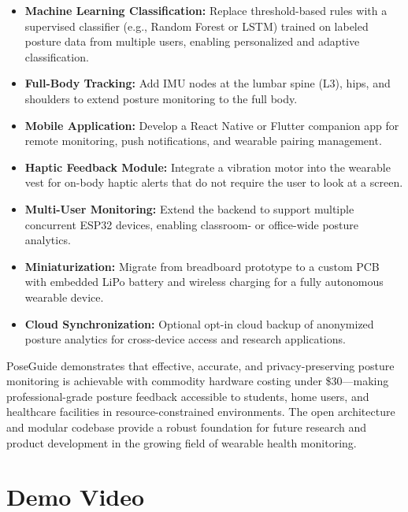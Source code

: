 \documentclass[12pt,a4paper]{report}
\begin{document}
\begin{itemize}[leftmargin=2em]
    \item \textbf{Machine Learning Classification:} Replace threshold-based rules with a supervised classifier (e.g., Random Forest or LSTM) trained on labeled posture data from multiple users, enabling personalized and adaptive classification.
    \item \textbf{Full-Body Tracking:} Add IMU nodes at the lumbar spine (L3), hips, and shoulders to extend posture monitoring to the full body.
    \item \textbf{Mobile Application:} Develop a React Native or Flutter companion app for remote monitoring, push notifications, and wearable pairing management.
    \item \textbf{Haptic Feedback Module:} Integrate a vibration motor into the wearable vest for on-body haptic alerts that do not require the user to look at a screen.
    \item \textbf{Multi-User Monitoring:} Extend the backend to support multiple concurrent ESP32 devices, enabling classroom- or office-wide posture analytics.
    \item \textbf{Miniaturization:} Migrate from breadboard prototype to a custom PCB with embedded LiPo battery and wireless charging for a fully autonomous wearable device.
    \item \textbf{Cloud Synchronization:} Optional opt-in cloud backup of anonymized posture analytics for cross-device access and research applications.
\end{itemize}

PoseGuide demonstrates that effective, accurate, and privacy-preserving posture monitoring is achievable with commodity hardware costing under \$30—making professional-grade posture feedback accessible to students, home users, and healthcare facilities in resource-constrained environments. The open architecture and modular codebase provide a robust foundation for future research and product development in the growing field of wearable health monitoring.


\chapter*{Demo Video}
\thispagestyle{fancy}
\end{document}
